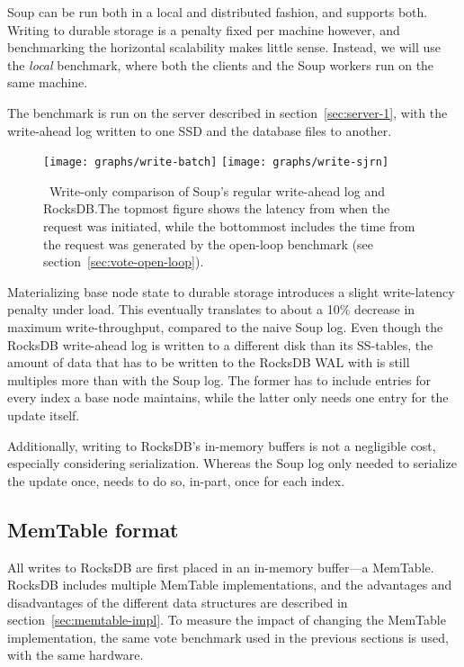 Soup can be run both in a local and distributed fashion, and 
supports both. Writing to durable storage is a penalty fixed per machine
however, and benchmarking the horizontal scalability makes little sense.
Instead, we will use the \textit{local}  benchmark, where both the
clients and the Soup workers run on the same machine.

The benchmark is run on the server described in section~\ref{sec:server-1}, with
the write-ahead log written to one SSD and the database files to another.

\begin{figure}[H]
  \centering
  \texttt{[image: graphs/write-batch]}
  \texttt{[image: graphs/write-sjrn]}
  \caption{\
    Write-only comparison of Soup's regular write-ahead log and RocksDB.\@ The
    topmost figure shows the latency from when the request was initiated, while
    the bottommost includes the time from the request was generated by the
    open-loop benchmark (see section~\ref{sec:vote-open-loop}).
  }\label{fig:graph-write}
\end{figure}

Materializing base node state to durable storage introduces a slight
write-latency penalty under load. This eventually translates to about a 10\%
decrease in maximum write-throughput, compared to the naive Soup log. Even
though the RocksDB write-ahead log is written to a different disk than its
SS-tables, the amount of data that has to be written to the RocksDB WAL with
\code{PersistentState} is still multiples more than with the Soup log. The
former has to include entries for every index a base node maintains, while the
latter only needs one entry for the update itself.

Additionally, writing to RocksDB's in-memory buffers is not a negligible cost,
especially considering serialization. Whereas the Soup log only needed to
serialize the update once, \code{PersistentState} needs to do so, in-part, once
for each index.

\subsection{MemTable format}

All writes to RocksDB are first placed in an in-memory buffer---a MemTable.
RocksDB includes multiple MemTable implementations, and the advantages and
disadvantages of the different data structures are described in
section~\ref{sec:memtable-impl}. To measure the impact of changing the MemTable
implementation, the same vote benchmark used in the previous sections is used,
with the same hardware.

